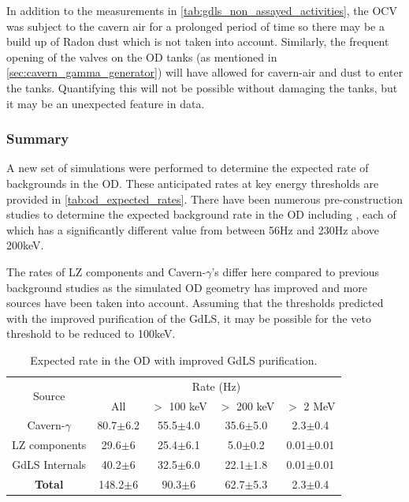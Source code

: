 \par
In addition to the measurements in \autoref{tab:gdls_non_assayed_activities}, the OCV was subject to the cavern air for a prolonged period of time so there may be a build up of Radon dust which is not taken into account.
Similarly, the frequent opening of the valves on the OD tanks (as mentioned in \autoref{sec:cavern_gamma_generator}) will have allowed for cavern-air and dust to enter the tanks.
Quantifying this will not be possible without damaging the tanks, but it may be an unexpected feature in data.

\subsubsection{Summary}
\par
A new set of simulations were performed to determine the expected rate of backgrounds in the OD.
These anticipated rates at key energy thresholds are provided in \autoref{tab:od_expected_rates}.
There have been numerous pre-construction studies to determine the expected background rate in the OD including \cite{LZ_TechnicalDesignReview_ref,LZ_projected_sensitivity_paper_ref,sallyshaw_thesis_ref,scotthaselschwardt_thesis_ref,lz_od_taup_2019_ref}, each of which has a significantly different value from between 56Hz and 230Hz above 200keV.
\par
The rates of LZ components and Cavern-$\gamma$'s differ here compared to previous background studies as the simulated OD geometry has improved and more sources have been taken into account.
Assuming that the thresholds predicted with the improved purification of the GdLS, it may be possible for the veto threshold to be reduced to 100keV.

\begin{table}[!htbp]
    \centering
    \begin{tabular}{c|c|c|c|c} %
    \hline
    \multirow{2}{*}{Source} & \multicolumn{4}{c}{Rate (Hz)} \\
                            & All          & $>$ 100 keV   & $>$ 200 keV   & $>$ 2 MeV \\ \hline
    Cavern-$\gamma$         & 80.7$\pm$6.2 & 55.5$\pm$4.0  & 35.6$\pm$5.0  & 2.3$\pm$0.4     \\
    LZ components           & 29.6$\pm$6   & 25.4$\pm$6.1  & 5.0$\pm$0.2   & 0.01$\pm$0.01   \\
    GdLS Internals          & 40.2$\pm$6   & 32.5$\pm$6.0  & 22.1$\pm$1.8  & 0.01$\pm$0.01   \\ \hline
    \textbf{Total}          & 148.2$\pm$6  & 90.3$\pm$6    & 62.7$\pm$5.3  & 2.3$\pm$0.4      \\ \hline
    \end{tabular}
    \caption{Expected rate in the OD with improved GdLS purification.}
    \label{tab:od_expected_rates}
\end{table} 

